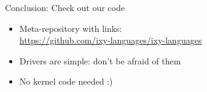 \documentclass[NET,english,aspectratio=43,notitleframe]{tumbeamer}
\begin{document}
%
%


\begin{frame}{Conclusion: Check out our code}
\centering {}
\begin{itemize}
\item Meta-repository with links:\\\url{https://github.com/ixy-languages/ixy-languages}
\item Drivers are simple: don't be afraid of them
\item No kernel code needed :)
\end{itemize}
\end{frame}
\end{document}
